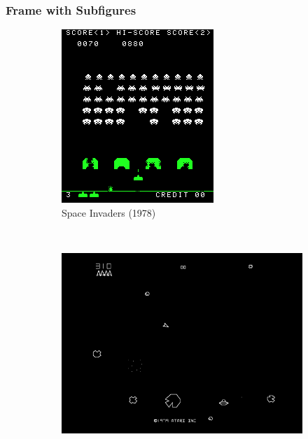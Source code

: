 \expandafter\documentclass\expandafter[table, usenames, svgnames, dvipsnames, \classopts]{beamer}
\begin{document}
\begin{frame} 
	\frametitle{\textbf{Frame with Subfigures}}

    \begin{figure}
	    \centering
	    \begin{subfigure}[!h]{0.25\paperwidth}
	    	\includegraphics[width=\textwidth]{space-invaders}
	        \caption{Space Invaders (1978)}
	    \end{subfigure}
	    ~
		\begin{subfigure}[!h]{0.25\paperwidth}
	        \includegraphics[width=\textwidth]{asteroids}

\end{subfigure}
\end{figure}
\end{frame}
\end{document}

